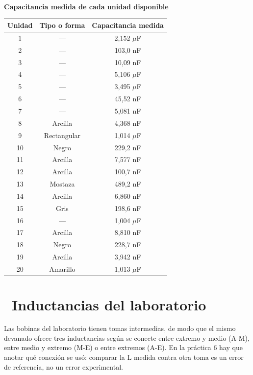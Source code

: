\documentclass[11pt,a4paper]{article}
\newcommand{\iconotexto}[2]{\textcolor{cyanNeon}{\faIcon{#1}}~#2}
\begin{document}
\begin{center}
\begin{minipage}{\linewidth}
\centering
{\small
\textbf{Capacitancia medida de cada unidad disponible}\par\smallskip
\begin{tabular}{@{}ccc@{}}
\toprule
Unidad & Tipo o forma & Capacitancia medida \\
\midrule
1 & --- & 2,152 $\mu$F \\
2 & --- & 103,0 nF \\
3 & --- & 10,09 nF \\
4 & --- & 5,106 $\mu$F \\
5 & --- & 3,495 $\mu$F \\
6 & --- & 45,52 nF \\
7 & --- & 5,081 nF \\
8 & Arcilla & 4,368 nF \\
9 & Rectangular & 1,014 $\mu$F \\
10 & Negro & 229,2 nF \\
11 & Arcilla & 7,577 nF \\
12 & Arcilla & 100,7 nF \\
13 & Mostaza & 489,2 nF \\
14 & Arcilla & 6,860 nF \\
15 & Gris & 198,6 nF \\
16 & --- & 1,004 $\mu$F \\
17 & Arcilla & 8,810 nF \\
18 & Negro & 228,7 nF \\
19 & Arcilla & 3,942 nF \\
20 & Amarillo & 1,013 $\mu$F \\
\bottomrule
\end{tabular}
}\par{}
\end{minipage}
\end{center}

\section{\iconotexto{paperclip}{Inductancias del laboratorio}}

Las bobinas del laboratorio tienen tomas intermedias, de modo que el mismo devanado ofrece tres inductancias según se conecte entre extremo y medio (A-M), entre medio y extremo (M-E) o entre extremos (A-E). En la práctica 6 hay que anotar qué conexión se usó: comparar la L medida contra otra toma es un error de referencia, no un error experimental.
\end{document}

